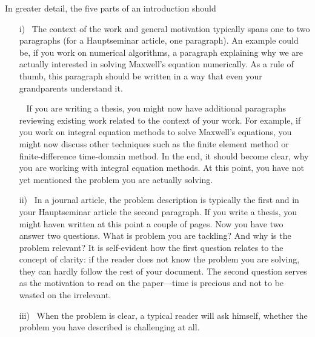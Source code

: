 In greater detail, the five parts of an introduction should
 \begin{enumerate}
     \item[i)~]   The context of the work and general motivation typically spans one to two paragraphs (for a Hauptseminar article, one paragraph).
                An example could be, if you work on numerical algorithms, a paragraph explaining why we are actually interested in solving Maxwell's equation numerically.
                As a rule of thumb, this paragraph should be written in a way that even your grandparents understand it.
    \item[~] If you are writing a thesis, you might now have additional paragraphs reviewing existing work related to the context of your work. 
               For example, if you work on integral equation methods to solve Maxwell's equations, you might now discuss other techniques such as the finite element method or finite-difference time-domain
               method.
               In the end, it should become clear, why you are working with integral equation methods.
               At this point, you have not yet mentioned the problem you are actually solving.
    \item[ii)~] In a journal article, the problem description is typically the first and in your Hauptseminar article the second paragraph. 
               If you write a thesis, you might haven written at this point a couple of pages.
               Now you have two answer two questions. 
               What is problem you are tackling? 
               And why is the problem relevant? 
               It is self-evident how the first question relates to the concept of clarity: 
               if the reader does not know the problem you are solving, they can hardly follow the rest of your document.
               The second question serves as the motivation to read on the paper---time is precious and not to be wasted on the irrelevant.
    \item[iii)~] When the problem is clear, a typical reader will ask himself, whether the problem you have described is challenging at all.

\end{enumerate}
